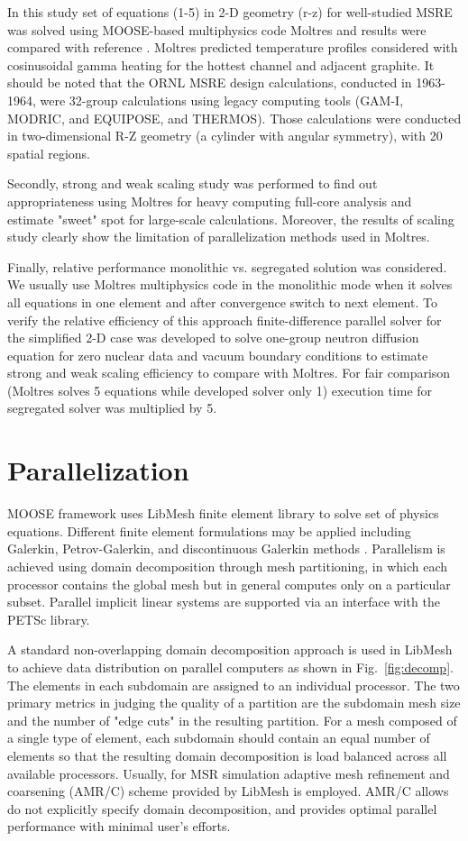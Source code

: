 \documentclass{anstrans}
\begin{document}
In this study set of equations (1-5) in 2-D geometry (r-z) for well-studied \gls{MSRE} was solved using MOOSE-based multiphysics code Moltres and results were compared with reference \cite{briggs_molten-salt_1964}. Moltres predicted temperature profiles considered with cosinusoidal gamma heating for the hottest channel and adjacent graphite. It should be noted that the ORNL MSRE design calculations, conducted in 1963-1964, were 32-group calculations using legacy computing tools (GAM-I, MODRIC, and EQUIPOSE, and THERMOS). Those calculations were conducted in two-dimensional R-Z geometry (a cylinder with angular symmetry), with 20 spatial regions. 

Secondly, strong and weak scaling study was performed to find out appropriateness using Moltres for heavy computing full-core analysis and estimate "sweet" spot for large-scale calculations. Moreover, the results of scaling study clearly show the limitation of parallelization methods used in Moltres.

Finally, relative performance monolithic vs. segregated solution was considered. We usually use Moltres multiphysics code in the monolithic mode when it solves all equations in one element and after convergence switch to next element. To verify the relative efficiency of this approach finite-difference parallel solver for the simplified 2-D case was developed to solve one-group neutron diffusion equation for zero nuclear data and vacuum boundary conditions to estimate strong and weak scaling efficiency to compare with Moltres. For fair comparison (Moltres solves 5 equations while developed solver only 1) execution time for segregated solver was multiplied by 5.

\section{Parallelization}

MOOSE framework uses LibMesh finite element library to solve set of physics equations. Different 
finite element formulations may be applied including Galerkin, Petrov-Galerkin, and discontinuous
 Galerkin methods \cite{kirk2006}. Parallelism is achieved using domain decomposition through mesh partitioning,
 in which each processor contains the global mesh but in general computes only on a particular subset. 
 Parallel implicit linear systems are supported via an interface with the PETSc library. 

A standard non-overlapping domain decomposition approach is used in LibMesh to achieve data distribution 
on parallel computers as shown in Fig.~\ref{fig:decomp}. The elements in each subdomain are assigned to an individual processor. The two primary metrics in judging the quality of a partition are the subdomain mesh size and the number of "edge cuts" in the resulting partition. For a mesh composed of a single type of element, each subdomain should contain an equal number of elements so that the resulting domain decomposition is load balanced across all available processors. Usually, for \gls{MSR} simulation adaptive mesh refinement and coarsening (AMR/C) scheme provided by LibMesh is employed. AMR/C allows do not explicitly specify domain decomposition, and provides optimal parallel performance with minimal user's efforts.
 
\end{document}
